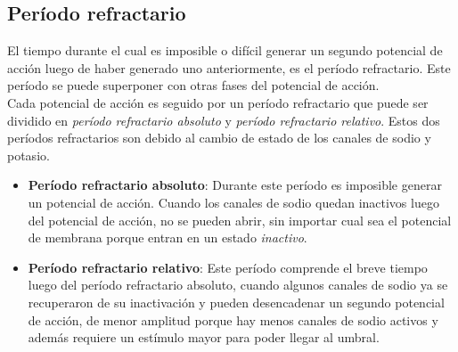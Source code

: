 \subsection{Período refractario}\label{subsec:periodo_refractario}
El tiempo durante el cual es imposible o difícil generar un segundo potencial de acción luego de haber generado uno anteriormente, es el período refractario. Este período se puede superponer con otras fases del potencial de acción.\\
Cada potencial de acción es seguido por un período refractario que puede ser dividido en \textit{período refractario absoluto} y \textit{período refractario relativo}. Estos dos períodos refractarios son debido al cambio de estado de los canales de sodio y potasio.
\begin{itemize}
    \item \textbf{Período refractario absoluto}: Durante este período es imposible generar un potencial de acción. Cuando los canales de sodio quedan inactivos luego del potencial de acción, no se pueden abrir, sin importar cual sea el potencial de membrana porque entran en un estado \textit{inactivo}.
    \item \textbf{Período refractario relativo}: Este período comprende el breve tiempo luego del período refractario absoluto, cuando algunos canales de sodio ya se recuperaron de su inactivación y pueden desencadenar un segundo potencial de acción, de menor amplitud porque hay menos canales de sodio activos y además requiere un estímulo mayor para poder llegar al umbral.
\end{itemize}
